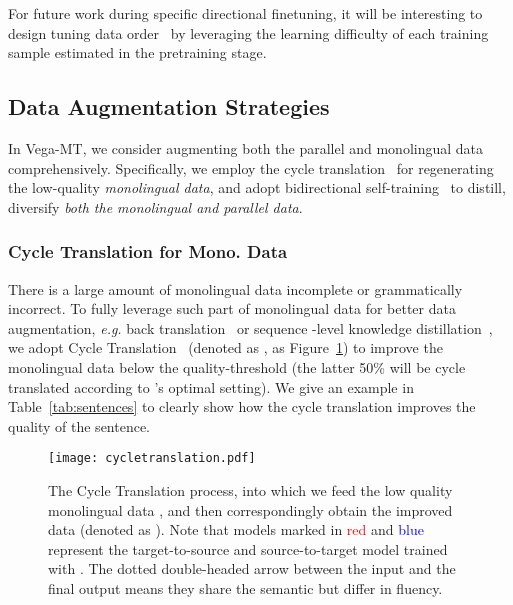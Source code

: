 \documentclass[11pt,a4paper]{article}
\newcommand{\zct}{\color{black}}
\begin{document}
For future work during specific directional finetuning, it will be interesting to design tuning data order~\cite{liu-etal-2020-norm,zhou-etal-2021-self} by leveraging the learning difficulty of each training sample estimated in the pretraining stage.

\subsection{Data Augmentation Strategies}
\label{ssec:DA}
In Vega-MT, we consider augmenting both the parallel and monolingual data comprehensively. Specifically, we employ the cycle translation~\cite{ding2019usyd} for regenerating the low-quality \textit{monolingual data}, and adopt bidirectional self-training~\cite{ding2021usyd} to distill, diversify \textit{both the monolingual and parallel data}.

\subsubsection{Cycle Translation for Mono. Data}
\label{ssec:ct}
There is a large amount of monolingual data incomplete or grammatically incorrect. To fully leverage such part of monolingual data for better data augmentation, \textit{e.g.} back translation~\cite{sennrich-etal-2016-improving} or {\zct sequence -level} knowledge distillation~\cite{kim-rush-2016-sequence}, we adopt Cycle Translation~\cite{ding2019usyd} (denoted as , as Figure~\ref{fig:cycle-translation}) to improve the monolingual data below the quality-threshold (the latter 50\% will be cycle translated according to \citet{ding2019usyd}'s optimal setting). We give an example in Table~\ref{tab:sentences} to clearly show how the cycle translation improves the quality of the sentence.

\begin{figure}[t!]
    \centering
    \texttt{[image: cycletranslation.pdf]}
    \caption{The Cycle Translation process, into which we feed the low quality monolingual data , and then correspondingly obtain the improved data  (denoted as ). Note that models marked in \textcolor{red}{red} and \textcolor{blue}{blue} represent the target-to-source and source-to-target model trained with . The dotted double-headed arrow between the input  and the final output  means they share the semantic but differ in fluency.}
    \label{fig:cycle-translation}
\end{figure}
\end{document}
